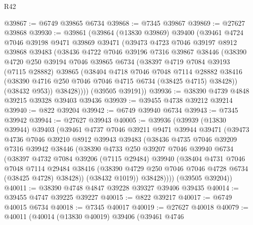 \begin{lexlean}{R42}
\begin{coremodule}
{@39867 := @6749 @39865 @6734
@39868 := @7345 @39867
@39869 := @27627 @39868
@39930 := @39861
    (@39864
      (@13830 @39869)
      @39400
      (@39461
        @4724
        @7046
        @39198
        @9471
        @39869
        @39471
        (@39473
          @4723
          @7046
          @39197
          @8912
          @39868
          @39483
          (@38436
            @4722
            @7046
            @39196
            @7316
            @39867
            @38446
            (@38390
              @4720
              @250
              @39194
              @7046
              @39865
              @6734
              (@38397
                @4719
                @7084
                @39193
                (@7115 @28882)
                @39865
                (@38404
                  @4718
                  @7046
                  @7048
                  @7114
                  @28882
                  @38416
                  (@38390 @4716 @250 @7046 @7046 @4715 @6734 (@38425 @4715) @38428))
                (@38432 @953))
              @38428))))
      (@39505 @39191))
@39936 := @38390 @4739 @4848 @39215 @39328 @39403 @39436
@39939 := @39455 @4738 @39212 @39214
@39940 := @822 @39204
@39942 := @6749 @39940 @6734
@39943 := @7345 @39942
@39944 := @27627 @39943
@40005 := @39936
    (@39939
      (@13830 @39944)
      @39403
      (@39461
        @4737
        @7046
        @39211
        @9471
        @39944
        @39471
        (@39473
          @4736
          @7046
          @39210
          @8912
          @39943
          @39483
          (@38436
            @4735
            @7046
            @39209
            @7316
            @39942
            @38446
            (@38390
              @4733
              @250
              @39207
              @7046
              @39940
              @6734
              (@38397
                @4732
                @7084
                @39206
                (@7115 @29484)
                @39940
                (@38404
                  @4731
                  @7046
                  @7048
                  @7114
                  @29484
                  @38416
                  (@38390 @4729 @250 @7046 @7046 @4728 @6734 (@38425 @4728) @38428))
                (@38432 @1019))
              @38428))))
      (@39505 @39204))
@40011 := @38390 @4748 @4847 @39228 @39327 @39406 @39435
@40014 := @39455 @4747 @39225 @39227
@40015 := @822 @39217
@40017 := @6749 @40015 @6734
@40018 := @7345 @40017
@40019 := @27627 @40018
@40079 := @40011
    (@40014
      (@13830 @40019)
      @39406
      (@39461
        @4746
}
\end{coremodule}
\end{lexlean}
